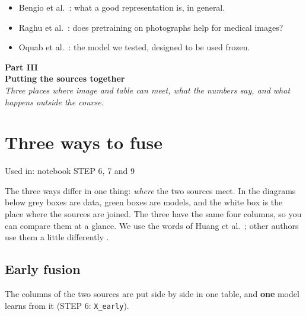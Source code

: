\documentclass[11pt,a4paper]{article}
\newcommand{\usedin}[1]{{\small\sffamily\color{black!60}Used in: #1}\par\vspace{0.2em}}
\newcommand{\code}[1]{\texttt{\small #1}}
\newcommand{\parthead}[3]{\clearpage
  {\noindent\small\sffamily\color{fusionteal}\textbf{#1}}\\[0.1em]
  {\noindent\LARGE\bfseries\sffamily #2}\\[0.3em]
  {\noindent\small\itshape #3}\par
  \vspace{0.2em}\noindent{\color{fusionteal}\rule{\linewidth}{0.8pt}}\par}
\newcommand{\further}[1]{\par\vspace{0.5em}\noindent{\small\sffamily\bfseries To study further}\par
  \begin{itemize}[leftmargin=1.4em,itemsep=0.1em,topsep=0.1em]\small #1\end{itemize}}
\begin{document}
\further{
\item Bengio et al.\ \cite{bengio2013representation}: what a good representation is, in general.
\item Raghu et al.\ \cite{raghu2019transfusion}: does pretraining on photographs help for medical images?
\item Oquab et al.\ \cite{oquab2023dinov2}: the model we tested, designed to be used frozen.
}

\parthead{Part III}{Putting the sources together}{Three places where image and table can meet, what the numbers say, and what happens outside the course.}

\section{Three ways to fuse}\label{c:6}
\usedin{notebook STEP 6, 7 and 9}

The three ways differ in one thing: \emph{where} the two sources meet. In the diagrams below grey boxes are
data, green boxes are models, and the white box is the place where the sources are joined. The three have the same
four columns, so you can compare them at a glance. We use the words of Huang et al.\ \cite{huang2020fusion}; other
authors use them a little differently \cite{cui2023fusionreview}.

\subsection{Early fusion}

The columns of the two sources are put side by side in one table, and \textbf{one} model learns from it
(STEP 6: \code{X\_early}).

\begin{center}
\end{center}
\end{document}
